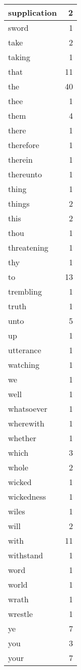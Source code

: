 \begin{center}
\begin{longtable}{l|r}
supplication & 2\\ \hline 
sword & 1\\ \hline 
take & 2\\ \hline 
taking & 1\\ \hline 
that & 11\\ \hline 
the & 40\\ \hline 
thee & 1\\ \hline 
them & 4\\ \hline 
there & 1\\ \hline 
therefore & 1\\ \hline 
therein & 1\\ \hline 
thereunto & 1\\ \hline 
thing & 1\\ \hline 
things & 2\\ \hline 
this & 2\\ \hline 
thou & 1\\ \hline 
threatening & 1\\ \hline 
thy & 1\\ \hline 
to & 13\\ \hline 
trembling & 1\\ \hline 
truth & 1\\ \hline 
unto & 5\\ \hline 
up & 1\\ \hline 
utterance & 1\\ \hline 
watching & 1\\ \hline 
we & 1\\ \hline 
well & 1\\ \hline 
whatsoever & 1\\ \hline 
wherewith & 1\\ \hline 
whether & 1\\ \hline 
which & 3\\ \hline 
whole & 2\\ \hline 
wicked & 1\\ \hline 
wickedness & 1\\ \hline 
wiles & 1\\ \hline 
will & 2\\ \hline 
with & 11\\ \hline 
withstand & 1\\ \hline 
word & 1\\ \hline 
world & 1\\ \hline 
wrath & 1\\ \hline 
wrestle & 1\\ \hline 
ye & 7\\ \hline 
you & 3\\ \hline 
your & 7\\ \hline 
\end{longtable}  
\end{center}  


